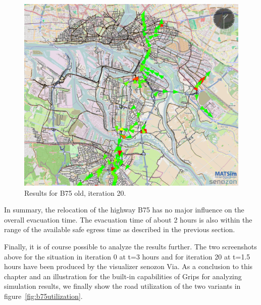 \begin{figure}
\centering
\includegraphics[width=0.7\linewidth]{extending/figures/Evacuation/B75iteration20}
\caption{Results for B75 old, iteration 20.}
\label{fig:B75iteration20}
\end{figure}


In summary, the relocation of the highway B75 has no major influence on the overall evacuation time. The evacuation time of about 2 hours is also within the range of the available safe egress time as described in the previous section. 

Finally, it is of course possible to analyze the results further. The two screenshots above for the situation in iteration 0 at t=3 hours and for iteration 20 at t=1.5 hours have been produced by the visualizer senozon Via.
As a conclusion to this chapter and an illustration for the built-in capabilities of Grips for analyzing simulation results, we finally show the road utilization of the two variants in figure~\ref{fig:b75utilization}.

